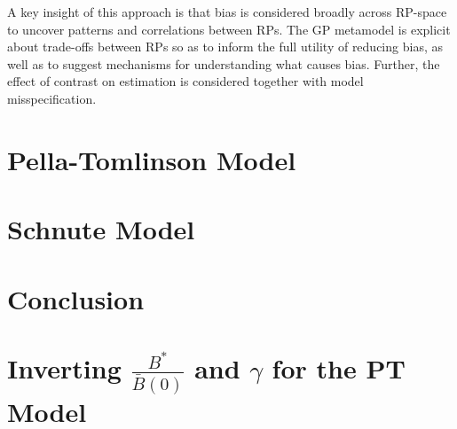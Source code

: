 \documentclass[11pt]{ucscthesis}
\renewcommand{\baselinestretch}{1.5}%
\begin{document}
{%
A key insight of this approach is that bias is considered broadly across RP-space to
uncover patterns and correlations between RPs. %
The GP metamodel is explicit about trade-offs between RPs %
so as to inform the full utility of reducing bias, as well as to suggest mechanisms for
understanding what causes bias. Further, the effect of contrast on estimation
is considered together with model misspecification. %

}

%
\chapter{Pella-Tomlinson Model}


%
\chapter{Schnute Model \label{schnuteChapter}}
%



%

%
\chapter{\color{red} Conclusion}

%
\appendix

%
\chapter{Inverting $\frac{B^*}{\bar B(0)}$ and $\gamma$ for the PT Model \label{lambApp}}
\begingroup



\def\baselinestretch{1.0}\large\normalsize
\end{document}
